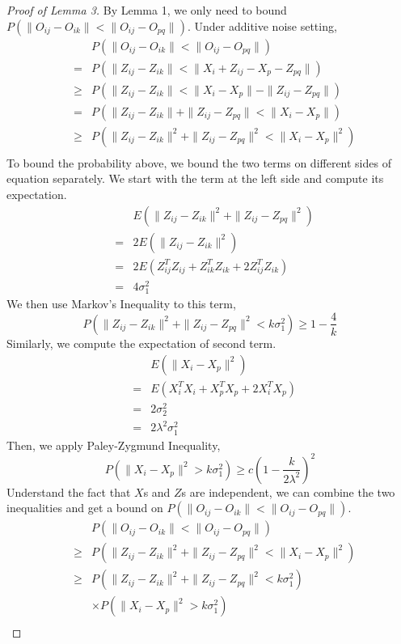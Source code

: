 \documentclass[11pt,journal,compsoc]{IEEEtran}
\begin{document}
\begin{proof}[Proof of Lemma 3]
By Lemma 1, we only need to bound $P(\|O_{ij}-O_{ik}\| < \|O_{ij}-O_{pq}\|)$. Under additive noise setting,
\begin{eqnarray*}
& &P(\|O_{ij}-O_{ik}\| < \|O_{ij}-O_{pq}\|) \\
&=&P(\|Z_{ij}-Z_{ik}\| < \|X_{i}+Z_{ij}-X_{p}-Z_{pq}\|) \\
&\geq&P(\|Z_{ij}-Z_{ik}\| < \|X_{i}-X_{p}\| - \|Z_{ij}-Z_{pq}\|) \\
&=& P(\|Z_{ij}-Z_{ik}\|+\|Z_{ij}-Z_{pq}\|< \|X_{i}-X_{p}\|) \\
&\geq& P(\|Z_{ij}-Z_{ik}\|^2+\|Z_{ij}-Z_{pq}\|^2< \|X_{i}-X_{p}\|^2) \\
\end{eqnarray*}
To bound the probability above, we bound the two terms on different sides of equation separately. We start with the term at the left side and compute its expectation.
 \begin{eqnarray*}
 & &E(\|Z_{ij}-Z_{ik}\|^2+\|Z_{ij}-Z_{pq}\|^2) \\
 &=&2 E(\|Z_{ij}-Z_{ik}\|^2) \\
 &=&2 E(Z_{ij}^T Z_{ij}+Z_{ik}^T Z_{ik} +2Z_{ij}^T Z_{ik}) \\
 &=&4\sigma_1^2
 \end{eqnarray*}
 We then use Markov's Inequality to this term, 
 \[P(\|Z_{ij}-Z_{ik}\|^2+\|Z_{ij}-Z_{pq}\|^2 < k\sigma_1^2) \geq 1-\frac{4}{k} \]
 Similarly, we compute the expectation of second term.
  \begin{eqnarray*}
  & &E(\|X_{i}-X_{p}\|^2) \\
  &=&E(X_{i}^T X_{i}+X_{p}^T X_{p}+2X_{i}^T X_{p}) \\
  &=&2\sigma_2^2 \\
  &=&2\lambda^2\sigma_1^2
  \end{eqnarray*}
Then, we apply Paley-Zygmund Inequality,
\[P(\|X_i-X_p\|^2 > k\sigma_1^2 ) \geq c(1-\frac{k}{2\lambda^2})^2 \]
Understand the fact that $X$s and $Z$s are independent, we can combine the two inequalities and get a bound on $P(\|O_{ij}-O_{ik}\| < \|O_{ij}-O_{pq}\|)$.
\begin{eqnarray*}
& &P(\|O_{ij}-O_{ik}\| < \|O_{ij}-O_{pq}\|) \\
&\geq& P(\|Z_{ij}-Z_{ik}\|^2+\|Z_{ij}-Z_{pq}\|^2< \|X_{i}-X_{p}\|^2) \\
&\geq& P(\|Z_{ij}-Z_{ik}\|^2+\|Z_{ij}-Z_{pq}\|^2<k\sigma_1^2) \\
& & \times P(\|X_i-X_p\|^2 > k\sigma_1^2 ) \\

\end{eqnarray*}
\end{proof}
\end{document}
